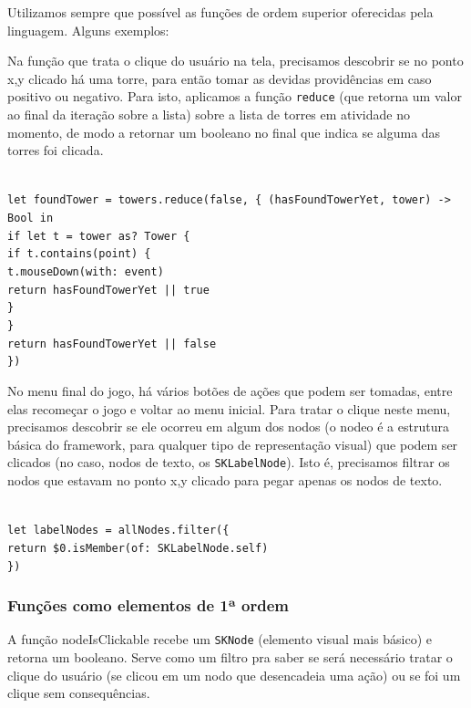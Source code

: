 \documentclass[rel_mlp]{iiufrgs}
\newcommand\tab[1][1cm]{\hspace*{#1}}
\begin{document}
Utilizamos sempre que possível as funções de ordem superior oferecidas pela linguagem. Alguns exemplos:

Na função que trata o clique do usuário na tela, precisamos descobrir se no ponto x,y clicado há uma torre, para então tomar as devidas providências em caso positivo ou negativo.
Para isto, aplicamos a função \texttt{reduce} (que retorna um valor ao final da iteração sobre a lista) sobre a lista de torres em atividade no momento, de modo a retornar um booleano no final que indica se alguma das torres foi clicada.

\texttt{
\\let foundTower = towers.reduce(false, \{ (hasFoundTowerYet, tower) \tab\tab\tab\tab\tab\tab\tab\tab\tab\tab\tab\tab\tab-> Bool in
    \\\tab if let t = tower as? Tower \{
    \\\tab\tab if t.contains(point) \{
    \\\tab\tab\tab t.mouseDown(with: event)
    \\\tab\tab\tab return hasFoundTowerYet || true
    \\\tab\tab \}
    \\\tab \}
    \\\tab return hasFoundTowerYet || false
\\\})}

No menu final do jogo, há vários botões de ações que podem ser tomadas, entre elas recomeçar o jogo e voltar ao menu inicial.
Para tratar o clique neste menu, precisamos descobrir se ele ocorreu em algum dos nodos (o nodeo é a estrutura básica do framework, para qualquer tipo de representação visual) que podem ser clicados (no caso, nodos de texto, os \texttt{SKLabelNode}). Isto é, precisamos filtrar os nodos que estavam no ponto x,y clicado para pegar apenas os nodos de texto.

\texttt{
\\let labelNodes = allNodes.filter(\{
\\\tab return \$0.isMember(of: SKLabelNode.self)
\\\})}


\subsubsection{Funções como elementos de 1ª ordem}

A função nodeIsClickable recebe um \texttt{SKNode} (elemento visual mais básico) e retorna um booleano. Serve como um filtro pra saber se será necessário tratar o clique do usuário (se clicou em um nodo que desencadeia uma ação) ou se foi um clique sem consequências.
\end{document}
